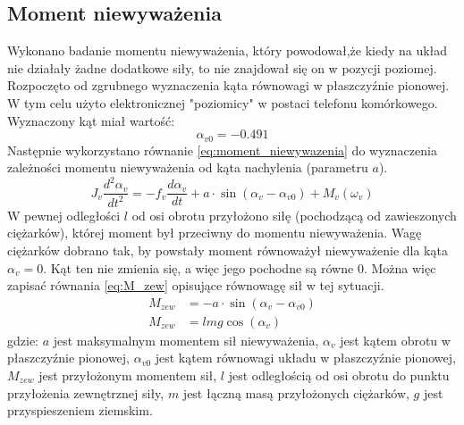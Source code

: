\documentclass[11pt,a4paper]{article}
\begin{document}
\subsection{Moment niewyważenia}
Wykonano badanie momentu niewyważenia, który powodował,że kiedy na układ nie działały żadne dodatkowe siły, to nie znajdował się on w pozycji poziomej. Rozpoczęto od zgrubnego wyznaczenia kąta równowagi w płaszczyźnie pionowej. W tym celu użyto elektronicznej "poziomicy" w postaci telefonu komórkowego. Wyznaczony kąt miał wartość:
\begin{equation}
\alpha_{v0} = -0.491
\end{equation}
Następnie wykorzystano równanie \eqref{eq:moment_niewywazenia} do wyznaczenia zależności momentu niewyważenia od kąta nachylenia (parametru \(a\)).
\begin{equation}
J_v \frac{d^2\alpha_v}{dt^2} = -f_v\frac{d\alpha_v}{dt}+a\cdot \sin(\alpha_v-\alpha_{v0})+M_v(\omega_v)
\label{eq:moment_niewywazenia}
\end{equation}
W pewnej odległości \(l\) od osi obrotu przyłożono siłę (pochodzącą od zawieszonych ciężarków), której moment był przeciwny do momentu niewyważenia. Wagę ciężarków dobrano tak, by powstały moment równoważył niewyważenie dla kąta \(\alpha_v=0\). Kąt ten nie zmienia się, a więc jego pochodne są równe \(0\). Można więc zapisać równania \eqref{eq:M_zew} opisujące równowagę sił w tej sytuacji.
\begin{equation}
\begin{aligned}
M_{zew} &= -a\cdot \sin(\alpha_v-\alpha_{v0})\\
M_{zew} &= lmg\cos(\alpha_v)
\end{aligned}
\label{eq:M_zew}
\end{equation}
\noindent gdzie:\newline
\(a\) jest maksymalnym momentem sił niewyważenia,\newline
\(\alpha_v\) jest kątem obrotu w płaszczyźnie pionowej,\newline
\(\alpha_{v0}\) jest kątem równowagi układu w płaszczyźnie pionowej,\newline
\(M_{zew}\) jest przyłożonym momentem sił,\newline
\(l\) jest odległością od osi obrotu do punktu przyłożenia zewnętrznej siły,\newline
\(m\) jest łączną masą przyłożonych ciężarków,\newline
\(g\) jest przyspieszeniem ziemskim.
\end{document}
